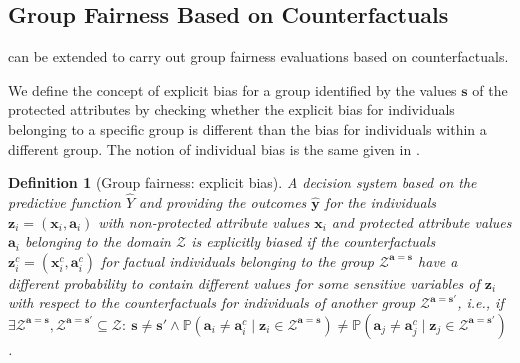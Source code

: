 \documentclass[letterpaper]{article} %
\newtheorem{definition}{Definition}
\begin{document}
\subsection{Group Fairness Based on Counterfactuals}

 can be extended to carry out group fairness evaluations based on counterfactuals.

We define the concept of explicit bias for a group identified by the values $\boldsymbol{s}$ of the protected attributes by checking whether the explicit bias for individuals belonging to a specific group is different than the bias for individuals within a different group.
%
The notion of individual bias is the same given in .
%
\begin{definition}[Group fairness: explicit bias]\label{explicit_bias_group}
	A decision system based on the predictive function $\hat{Y}$ and providing the outcomes $\boldsymbol{\hat{y}}$ for the individuals $\boldsymbol{z}_i = (\boldsymbol{x}_i, \boldsymbol{a}_i)$ with non-protected attribute values $\boldsymbol{x}_{i}$ and protected attribute values $\boldsymbol{a}_{i}$ belonging to the domain $\mathcal{Z}$ is \emph{explicitly biased} if the counterfactuals $\boldsymbol{z}_i^c = (\boldsymbol{x}_i^c, \boldsymbol{a}_i^c)$ for factual individuals belonging to the group $\mathcal{Z}^{\boldsymbol{a}=\boldsymbol{s}}$ have a different probability to contain different values for some sensitive variables of $\boldsymbol{z}_i$ with respect to the counterfactuals for individuals of another group $\mathcal{Z}^{\boldsymbol{a}=\boldsymbol{s}'}$, i.e., if $\exists \mathcal{Z}^{\boldsymbol{a}=\boldsymbol{s}}, \mathcal{Z}^{\boldsymbol{a}=\boldsymbol{s}'} \subseteq \mathcal{Z} : ~ \boldsymbol{s} \neq \boldsymbol{s}' \wedge \mathbb{P}(\boldsymbol{a}_{i} \neq \boldsymbol{a}_{i}^{c} \mid \boldsymbol{z}_i \in \mathcal{Z}^{\boldsymbol{a}=\boldsymbol{s}}) \neq \mathbb{P}(\boldsymbol{a}_{j} \neq \boldsymbol{a}_{j}^{c} \mid \boldsymbol{z}_j \in \mathcal{Z}^{\boldsymbol{a}=\boldsymbol{s}'})$.
\end{definition}
\end{document}
